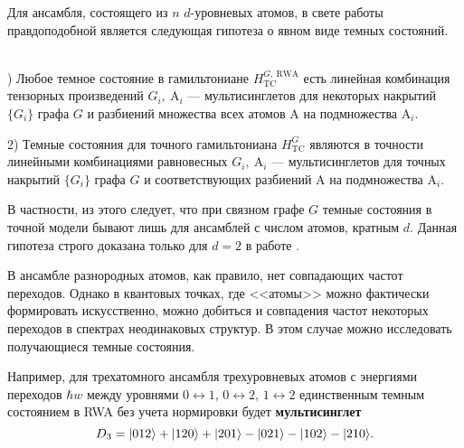 \noindent Для ансамбля, состоящего из $n$ $d$-уровневых атомов, в свете работы \cite{quantum_simulation_homogeneous} правдоподобной является следующая гипотеза о явном виде темных состояний.

\begin{hyp}
	\
	\\
	) Любое темное состояние в гамильтониане $H^{G,~\text{RWA}}_{\text{TC}}$ есть линейная комбинация тензорных произведений $G_{i},~\text{A}_{i}$ --- мультисинглетов для некоторых накрытий $\{ G_{i}\}$ графа $G$ и разбиений множества всех атомов $\text{A}$ на подмножества $\text{A}_{i}$. 
	
	2) Темные состояния для точного гамильтониана $H^G_{\text{TC}}$ являются в точности линейными комбинациями равновесных $G_{i},~\text{A}_{i}$ --- мультисинглетов для точных накрытий $\{ G_{i}\}$ графа $G$ и соответствующих разбиений $\text{A}$ на подмножества $\text{A}_{i}$. 
\end{hyp}

В частности, из этого следует, что при связном графе $G$ темные состояния в точной модели бывают лишь для ансамблей с числом атомов, кратным $d$. Данная гипотеза строго доказана только для $d=2$ в работе \cite{dark_states_dimension}.

В ансамбле разнородных атомов, как правило, нет совпадающих частот переходов. Однако в квантовых точках, где <<атомы>> можно фактически формировать искусственно, можно добиться и совпадения частот некоторых переходов в спектрах неодинаковых структур. В этом случае можно исследовать получающиеся темные состояния.

Например, для трехатомного ансамбля трехуровневых атомов с энергиями переходов $\hbar w$ между уровнями $0 \leftrightarrow 1$, $0 \leftrightarrow 2$, $1 \leftrightarrow 2$ единственным темным состоянием в RWA \cite{ozhigov_qq,rwa_rabi_1,rwa_rabi_2} без учета нормировки будет \textbf{мультисинглет}
\begin{equation}
	D_{3} = |012\rangle + |120\rangle + |201\rangle - |021\rangle - |102\rangle - |210\rangle.
\end{equation}

